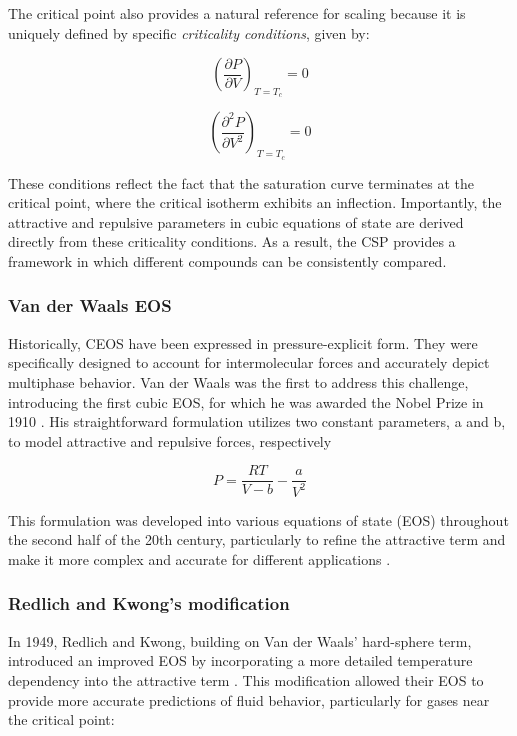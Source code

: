 The critical point also provides a natural reference for scaling because it is
uniquely defined by specific \emph{criticality conditions}, given by:  

\begin{equation}
  \left(\frac{\partial P}{\partial V}\right)_{T=T_c} = 0
\end{equation}

\begin{equation}
  \left(\frac{\partial^2 P}{\partial V^2}\right)_{T=T_c} = 0
\end{equation}

These conditions reflect the fact that the saturation curve terminates at the
critical point, where the critical isotherm exhibits an inflection. Importantly,
the attractive and repulsive parameters in cubic equations of state are derived
directly from these criticality conditions. As a result, the CSP provides a
framework in which different compounds can be consistently compared.  


	\subsubsection{Van der Waals EOS}
	Historically, CEOS have been expressed in pressure-explicit form. They were
	specifically designed to account for intermolecular forces and accurately
	depict multiphase behavior. Van der Waals was the first to address this
	challenge, introducing the first cubic EOS, for which he was awarded the
	Nobel Prize in 1910 \cite{van1910equation}. His straightforward formulation
	utilizes two constant parameters, a and b, to model attractive and repulsive
	forces, respectively

	\begin{equation}
		P = \frac{RT}{V-b} - \frac{a}{V^2}
	\end{equation}

	This formulation was developed into various equations of state (EOS)
	throughout the second half of the 20th century, particularly to refine the
	attractive term and make it more complex and accurate for different
	applications \cite{wei2000equations}.

	\subsubsection{Redlich and Kwong's modification}
	
	In 1949, Redlich and Kwong, building on Van der Waals’ hard-sphere term,
	introduced an improved EOS by incorporating a more detailed temperature
	dependency into the attractive term \cite{redlich1949thermodynamics}. This
	modification allowed their EOS to provide more accurate predictions of fluid
	behavior, particularly for gases near the critical point:

